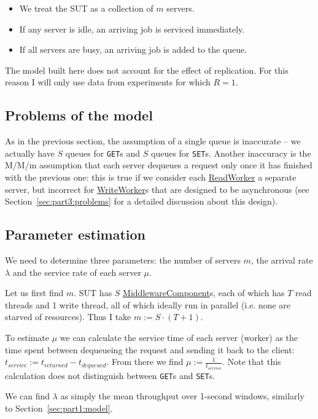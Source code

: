 \documentclass[11pt]{article}
\newcommand{\get}[0]{\texttt{GET}}
\newcommand{\set}[0]{\texttt{SET}}
\newcommand{\linkmain}[1]{\href{https://gitlab.inf.ethz.ch/pungast/asl-fall16-project/blob/master/src/main/java/asl/#1.java}{#1}}
\begin{document}
\begin{itemize}
	\item We treat the SUT as a collection of $m$ servers.
	\item If any server is idle, an arriving job is serviced immediately.
	\item If all servers are busy, an arriving job is added to the queue.
\end{itemize}

The model built here does not account for the effect of replication. For this reason I will only use data from experiments for which $R=1$.

\subsection{Problems of the model}
As in the previous section, the assumption of a single queue is inaccurate -- we actually have $S$ queues for \get{}s and $S$ queues for \set{}s. Another inaccuracy is the M/M/m assumption that each server dequeues a request only once it has finished with the previous one: this is true if we consider each \linkmain{ReadWorker} a separate server, but incorrect for \linkmain{WriteWorker}s that are designed to be asynchronous (see Section~\ref{sec:part3:problems} for a detailed discussion about this design).

\subsection{Parameter estimation}

We need to determine three parameters: the number of servers $m$, the arrival rate $\lambda$ and the service rate of each server $\mu$.

Let us first find $m$. SUT has $S$ \linkmain{MiddlewareComponent}s, each of which has $T$ read threads and 1 write thread, all of which ideally run in parallel (i.e. none are starved of resources). Thus I take $m := S \cdot (T + 1)$.

To estimate $\mu$ we can calculate the service time of each server (worker) as the time spent between dequeueing the request and sending it back to the client: $t_{service} := t_{returned} - t_{dequeued}$. From there we find $\mu := \frac{1}{t_{service}}$. Note that this calculation does not distinguish between \get{}s and \set{}s.

We can find $\lambda$ as simply the mean throughput over 1-second windows, similarly to Section~\ref{sec:part1:model}.
\end{document}
